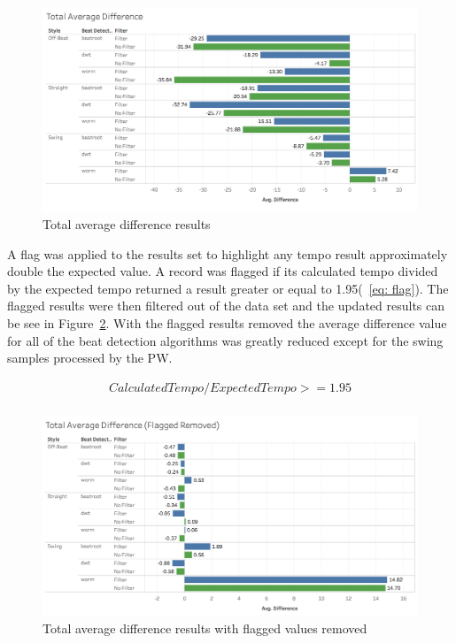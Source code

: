 \documentclass[a4paper, 11pt]{article}
\begin{document}
\begin{figure}[htbp]
\centering
\includegraphics[scale=0.25]{images/totAveDiff.jpg}
\caption{Total average difference results}
\label{fig: aveDiff}
\end{figure}

A flag was applied to the results set to highlight any tempo result approximately double the expected value. A record was flagged if its calculated tempo divided by the expected tempo returned a result greater or equal to 1.95(~\ref{eq: flag}). The flagged results were then filtered out of the data set and the updated results can be see in Figure~\ref{fig: upAveDiff}. With the flagged results removed the average difference value for all of the beat detection algorithms was greatly reduced except for the swing samples processed by the PW. 

\begin{equation}\label{eq: flag}
\begin{split}
Calculated Tempo/Expected Tempo >= 1.95\\
\end{split}
\end{equation}

\begin{figure}[htbp]
\centering
\includegraphics[scale=0.25]{images/totAveDiffFR.jpg}
\caption{Total average difference results with flagged values removed}
\label{fig: upAveDiff}
\end{figure}
\end{document}
